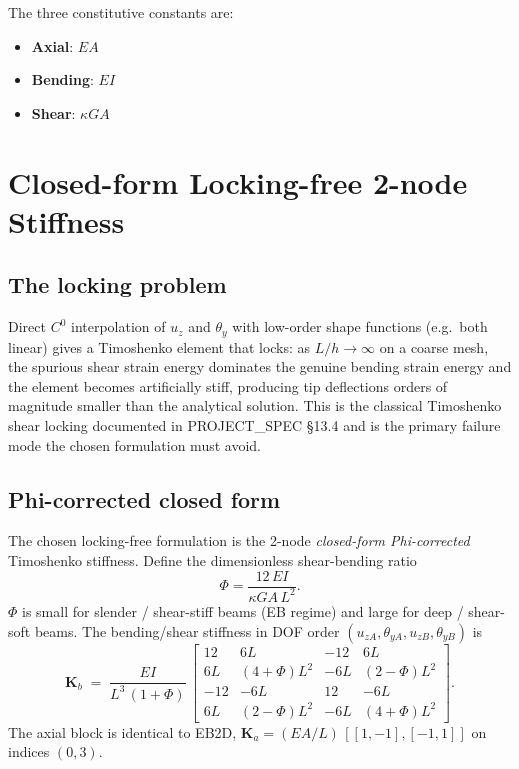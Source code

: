 \documentclass[11pt,a4paper]{article}
\newcommand{\bmath}[1]{\boldsymbol{#1}}
\begin{document}
The three constitutive constants are:
\begin{itemize}
    \item \textbf{Axial}: $EA$
    \item \textbf{Bending}: $EI$
    \item \textbf{Shear}: $\kappa GA$
\end{itemize}

\section{Closed-form Locking-free 2-node Stiffness}\label{sec:stiffness}

\subsection{The locking problem}

Direct $C^0$ interpolation of $u_z$ and $\theta_y$ with low-order shape functions (e.g.\ both linear) gives a Timoshenko element that locks: as $L/h \to \infty$ on a coarse mesh, the spurious shear strain energy dominates the genuine bending strain energy and the element becomes artificially stiff, producing tip deflections orders of magnitude smaller than the analytical solution. This is the classical Timoshenko shear locking documented in PROJECT\_SPEC \S13.4 and is the primary failure mode the chosen formulation must avoid.

\subsection{Phi-corrected closed form}

The chosen locking-free formulation is the 2-node \emph{closed-form Phi-corrected} Timoshenko stiffness. Define the dimensionless shear-bending ratio
\[
\boxed{\;\Phi = \dfrac{12\,E I}{\kappa GA\,L^2}.\;}
\]
$\Phi$ is small for slender / shear-stiff beams (EB regime) and large for deep / shear-soft beams. The bending/shear stiffness in DOF order $(u_{zA}, \theta_{yA}, u_{zB}, \theta_{yB})$ is
\[
\boxed{\;
\bmath{K}_b \;=\; \dfrac{E I}{L^3\,(1+\Phi)}\,
\begin{bmatrix}
12      & 6L           & -12     & 6L          \\
6L      & (4+\Phi)L^2  & -6L     & (2-\Phi)L^2 \\
-12     & -6L          & 12      & -6L         \\
6L      & (2-\Phi)L^2  & -6L     & (4+\Phi)L^2
\end{bmatrix}.
\;}
\]
The axial block is identical to EB2D, $\bmath{K}_a = (EA/L)\,[[1,-1],[-1,1]]$ on indices $(0, 3)$.
\end{document}
